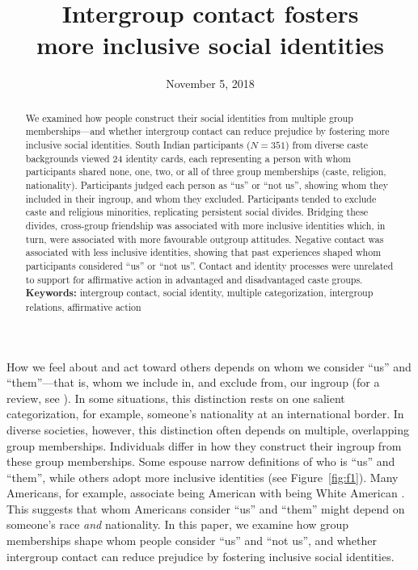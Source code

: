 \documentclass[12pt, a4paper]{article}
\title{Intergroup contact fosters\\more inclusive social identities}
\date{November 5, 2018}
\begin{document}
\maketitle

\begin{abstract}
\noindent We examined how people construct their social identities from multiple group memberships---and whether intergroup contact can reduce prejudice by fostering more inclusive social identities. South Indian participants ($N = 351$) from diverse caste backgrounds viewed 24 identity cards, each representing a person with whom participants shared none, one, two, or all of three group memberships (caste, religion, nationality). Participants judged each person as ``us'' or ``not us'', showing whom they included in their ingroup, and whom they excluded.  Participants tended to exclude caste and religious minorities, replicating persistent social divides. Bridging these divides, cross-group friendship was associated with more inclusive identities which, in turn, were associated with more favourable outgroup attitudes. Negative contact was associated with less inclusive identities, showing that past experiences shaped whom participants considered ``us'' or ``not us''. Contact and identity processes were unrelated to support for affirmative action in advantaged and disadvantaged caste groups.\\[1ex]
\noindent \textbf{Keywords:} intergroup contact, social identity, multiple categorization, intergroup relations, affirmative action \\[1ex]
\end{abstract}

\linenumbers

\noindent How we feel about and act toward others depends on whom we consider ``us'' and ``them''---that is, whom we include in, and exclude from, our ingroup (for a review, see ). In some situations, this distinction rests on one salient categorization, for example, someone’s nationality at an international border. In diverse societies, however, this distinction often depends on multiple, overlapping group memberships. Individuals differ in how they construct their ingroup from these group memberships. Some espouse narrow definitions of who is ``us'' and ``them'', while others adopt more inclusive identities (see Figure~\ref{fig:f1}). Many Americans, for example, associate being American with being White American \cite{devos_american_2005}. This suggests that whom Americans consider ``us'' and ``them'' might depend on someone's race \emph{and} nationality. In this paper, we examine how group memberships shape whom people consider ``us'' and ``not us'', and whether intergroup contact can reduce prejudice by fostering inclusive social identities. 
\end{document}
